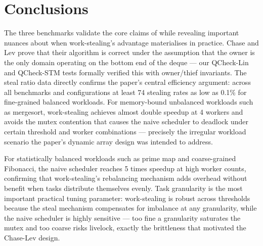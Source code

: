 \documentclass[11pt,a4paper]{article}
\begin{document}
\section{Conclusions}
\label{sec:conclusions}

The three benchmarks validate the core claims of \cite{chase2005dynamic}
while revealing important nuances about when work-stealing's advantage
materialises in practice. Chase and Lev prove that their algorithm is correct
under the assumption that the owner is the only domain operating on the bottom
end of the deque — our QCheck-Lin and QCheck-STM tests formally verified this
with owner/thief invariants. The steal ratio data directly confirms the paper's
central efficiency argument: across all benchmarks and configurations at least
74%
stealing rates as low as 0.1\% for fine-grained balanced workloads. For
memory-bound unbalanced workloads such as mergesort, work-stealing achieves
almost double speedup at 4 workers and avoids the mutex contention that causes
the naive scheduler to deadlock under certain threshold and worker combinations
— precisely the irregular workload scenario the paper's dynamic array design
was intended to address.

For statistically balanced workloads such as prime map and coarse-grained Fibonacci,
the naive scheduler reaches 5 times speedup at high worker counts, confirming
that work-stealing's rebalancing mechanism adds overhead without benefit
when tasks distribute themselves evenly. Task granularity is the most important
practical tuning parameter: work-stealing is robust across thresholds because
the steal mechanism compensates for imbalance at any granularity, while the naive
scheduler is highly sensitive — too fine a granularity saturates the mutex and
too coarse risks livelock, exactly the brittleness that motivated the Chase-Lev
design.
\end{document}
